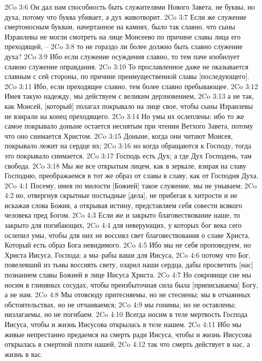 2Co 3:6  Он дал нам способность быть служителями Нового Завета, не буквы, но духа, потому что буква убивает, а дух животворит.
2Co 3:7  Если же служение смертоносным буквам, начертанное на камнях, было так славно, что сыны Израилевы не могли смотреть на лице Моисеево по причине славы лица его преходящей, --
2Co 3:8  то не гораздо ли более должно быть славно служение духа?
2Co 3:9  Ибо если служение осуждения славно, то тем паче изобилует славою служение оправдания.
2Co 3:10  То прославленное даже не оказывается славным с сей стороны, по причине преимущественной славы [последующего].
2Co 3:11  Ибо, если преходящее славно, тем более славно пребывающее.
2Co 3:12  Имея такую надежду, мы действуем с великим дерзновением,
2Co 3:13  а не так, как Моисей, [который] полагал покрывало на лице свое, чтобы сыны Израилевы не взирали на конец преходящего.
2Co 3:14  Но умы их ослеплены: ибо то же самое покрывало доныне остается неснятым при чтении Ветхого Завета, потому что оно снимается Христом.
2Co 3:15  Доныне, когда они читают Моисея, покрывало лежит на сердце их;
2Co 3:16  но когда обращаются к Господу, тогда это покрывало снимается.
2Co 3:17  Господь есть Дух; а где Дух Господень, там свобода.
2Co 3:18  Мы же все открытым лицем, как в зеркале, взирая на славу Господню, преображаемся в тот же образ от славы в славу, как от Господня Духа.
2Co 4:1  Посему, имея по милости [Божией] такое служение, мы не унываем;
2Co 4:2  но, отвергнув скрытные постыдные [дела], не прибегая к хитрости и не искажая слова Божия, а открывая истину, представляем себя совести всякого человека пред Богом.
2Co 4:3  Если же и закрыто благовествование наше, то закрыто для погибающих,
2Co 4:4  для неверующих, у которых бог века сего ослепил умы, чтобы для них не воссиял свет благовествования о славе Христа, Который есть образ Бога невидимого.
2Co 4:5  Ибо мы не себя проповедуем, но Христа Иисуса, Господа; а мы--рабы ваши для Иисуса,
2Co 4:6  потому что Бог, повелевший из тьмы воссиять свету, озарил наши сердца, дабы просветить [нас] познанием славы Божией в лице Иисуса Христа.
2Co 4:7  Но сокровище сие мы носим в глиняных сосудах, чтобы преизбыточная сила была [приписываема] Богу, а не нам.
2Co 4:8  Мы отовсюду притесняемы, но не стеснены; мы в отчаянных обстоятельствах, но не отчаиваемся;
2Co 4:9  мы гонимы, но не оставлены; низлагаемы, но не погибаем.
2Co 4:10  Всегда носим в теле мертвость Господа Иисуса, чтобы и жизнь Иисусова открылась в теле нашем.
2Co 4:11  Ибо мы живые непрестанно предаемся на смерть ради Иисуса, чтобы и жизнь Иисусова открылась в смертной плоти нашей,
2Co 4:12  так что смерть действует в нас, а жизнь в вас.
